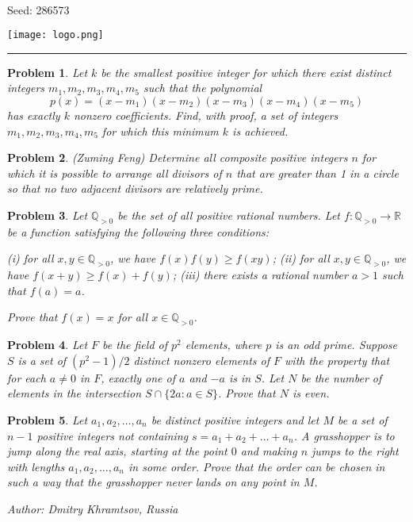 \documentclass[12pt]{article}
\newtheorem{opg}{Problem}
\begin{document}
\parbox{0.6\textwidth}{ \\[2ex] {\Large Seed: 286573}}
\parbox{0.4\textwidth}{\texttt{[image: logo.png]}}

\hrule

\begin{opg}
Let $k$ be the smallest positive integer for which there exist
distinct integers $m_1, m_2, m_3, m_4, m_5$ such that the polynomial
\[
p(x) = (x-m_1)(x-m_2)(x-m_3)(x-m_4)(x-m_5)
\]
has exactly $k$ nonzero coefficients. Find, with proof, a set of
integers $m_1, m_2, m_3, m_4, m_5$ for which this minimum $k$ is achieved.

\end{opg}
\begin{opg}
(Zuming Feng) Determine all composite positive integers $n$ for which it is possible to arrange all divisors of $n$ that are greater than 1 in a circle so that no two adjacent divisors are relatively prime.


\end{opg}
\begin{opg}
Let $\mathbb Q_{>0}$ be the set of all positive rational numbers. Let $f:\mathbb Q_{>0}\to\mathbb R$ be a function satisfying the following three conditions:

(i) for all $x,y\in\mathbb Q_{>0}$, we have $f(x)f(y)\geq f(xy)$;
(ii) for all $x,y\in\mathbb Q_{>0}$, we have $f(x+y)\geq f(x)+f(y)$;
(iii) there exists a rational number $a>1$ such that $f(a)=a$.

Prove that $f(x)=x$ for all $x\in\mathbb Q_{>0}$.


\end{opg}
\begin{opg}
Let $F$ be the field of $p^2$ elements, where $p$ is an odd
prime. Suppose $S$ is a set of $(p^2-1)/2$ distinct nonzero elements
of $F$ with the property that for each $a\neq 0$ in $F$, exactly one
of $a$ and $-a$ is in $S$. Let $N$ be the number of elements in the
intersection $S \cap \{2a: a \in S\}$. Prove that $N$ is even.

\end{opg}
\begin{opg}
Let $a_1,a_2,\ldots,a_n$ be distinct positive integers and let $M$ be a set of $n-1$ positive integers not containing $s=a_1+a_2+\ldots+a_n$. A grasshopper is to jump along the real axis, starting at the point $0$ and making $n$ jumps to the right with lengths $a_1,a_2,\ldots,a_n$ in some order. Prove that the order can be chosen in such a way that the grasshopper never lands on any point in $M$.

Author: Dmitry Khramtsov, Russia


\end{opg}
\end{document}
